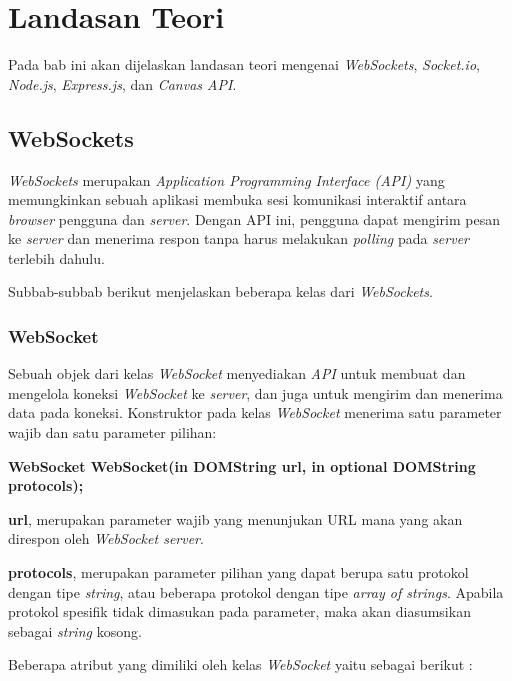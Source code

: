 \chapter{Landasan Teori}
\label{chap:teori}

Pada bab ini akan dijelaskan landasan teori mengenai \textit{WebSockets}, \textit{Socket.io}, \textit{Node.js}, \textit{Express.js}, dan \textit{Canvas API}.

\section{WebSockets}
\label{sec:WebSockets} 

\textit{WebSockets} merupakan \textit{Application Programming Interface (API)} yang memungkinkan sebuah aplikasi membuka sesi komunikasi interaktif antara \textit{browser} pengguna dan \textit{server}. Dengan API ini, pengguna dapat mengirim pesan ke \textit{server} dan menerima respon tanpa harus melakukan \textit{polling} pada \textit{server} terlebih dahulu.

Subbab-subbab berikut menjelaskan beberapa kelas dari \textit{WebSockets}.

\subsection{WebSocket}
Sebuah objek dari kelas \textit{WebSocket} menyediakan \textit{API} untuk membuat dan mengelola koneksi \textit{WebSocket} ke \textit{server}, dan juga untuk mengirim dan menerima data pada koneksi. Konstruktor pada kelas \textit{WebSocket} menerima satu parameter wajib dan satu parameter pilihan:

\textbf{WebSocket WebSocket(in DOMString url, in optional DOMString protocols);}

\textbf{url}, merupakan parameter wajib yang menunjukan URL mana yang akan direspon oleh \textit{WebSocket server}.

\textbf{protocols}, merupakan parameter pilihan yang dapat berupa satu protokol dengan tipe \textit{string}, atau beberapa protokol dengan tipe \textit{array of strings}. Apabila protokol spesifik tidak dimasukan pada parameter, maka akan diasumsikan sebagai \textit{string} kosong.

Beberapa atribut yang dimiliki oleh kelas \textit{WebSocket} yaitu sebagai berikut :

